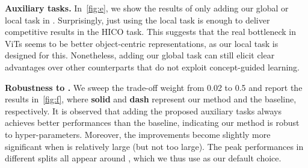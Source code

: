 \documentclass{article} \usepackage{iclr2022_conference,times}
\renewcommand{\paragraph}[1]{\noindent\textbf{#1.}}
\begin{document}
\paragraph{Auxiliary tasks}
In~\autoref{fig:e}, we show the results of only adding our global or local task in . Surprisingly, just using the local task is enough to deliver competitive results in the HICO task. This suggests that the real bottleneck in ViTs seems to be better object-centric representations, as our local task is designed for this. Nonetheless, adding our global task can still elicit clear advantages over other counterparts that do not exploit concept-guided learning.

\paragraph{Robustness to }
We sweep the trade-off weight  from 0.02 to 0.5 and report the results in~\autoref{fig:f}, where \textbf{solid} and \textbf{dash} represent our method and the baseline, respectively. It is observed that adding the proposed auxiliary tasks always achieves better performances than the baseline, indicating our method is robust to hyper-parameters.  Moreover, the improvements become slightly more significant when  is relatively large (but not too large). The peak performances in different splits all appear around , which we thus use as our default choice. 
\end{document}
